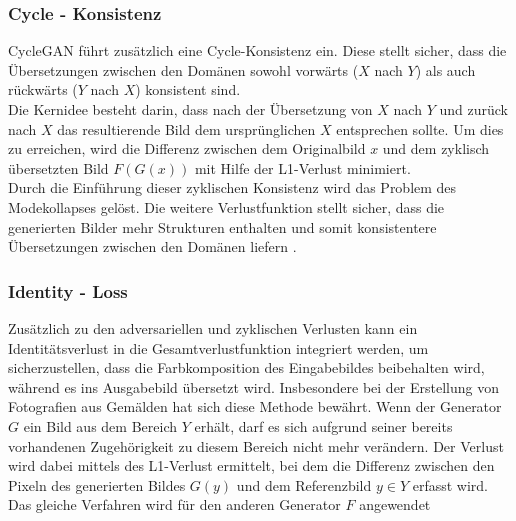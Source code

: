 \subsubsection{Cycle - Konsistenz}
CycleGAN führt zusätzlich eine Cycle-Konsistenz ein. Diese stellt sicher, dass die Übersetzungen zwischen den Domänen sowohl vorwärts ($X$ nach $Y$) als auch rückwärts ($Y$ nach $X$) konsistent sind.
\\
Die Kernidee besteht darin, dass nach der Übersetzung von $X$ nach $Y$ und zurück nach $X$ das resultierende Bild dem ursprünglichen $X$ entsprechen sollte. Um dies zu erreichen, wird die Differenz zwischen dem Originalbild $x$ und dem zyklisch übersetzten Bild $F(G(x))$ mit Hilfe der L1-Verlust minimiert. 
\\
Durch die Einführung dieser zyklischen Konsistenz wird das Problem des Modekollapses gelöst. Die weitere Verlustfunktion stellt sicher, dass die generierten Bilder mehr Strukturen enthalten und somit konsistentere Übersetzungen zwischen den Domänen liefern \cite{Zhu.2017}.

\subsubsection{Identity - Loss}
Zusätzlich zu den adversariellen und zyklischen Verlusten kann ein Identitätsverlust in die Gesamtverlustfunktion integriert werden, um sicherzustellen, dass die Farbkomposition des Eingabebildes beibehalten wird, während es ins Ausgabebild übersetzt wird. Insbesondere bei der Erstellung von Fotografien aus Gemälden hat sich diese Methode bewährt.  
Wenn der Generator $G$ ein Bild aus dem Bereich $Y$ erhält, darf es sich aufgrund seiner bereits vorhandenen Zugehörigkeit zu diesem Bereich nicht mehr verändern. 
Der Verlust wird dabei mittels des L1-Verlust ermittelt, bei dem die Differenz zwischen den Pixeln des generierten Bildes $G(y)$ und dem Referenzbild $y\in Y$ erfasst wird. Das gleiche Verfahren wird für den anderen Generator $F$ angewendet \cite{Zhu.2017}

